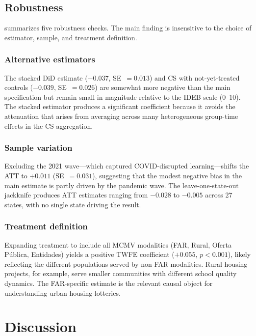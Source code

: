 \documentclass[12pt]{article}
\begin{document}
\subsection{Robustness}



 summarizes five robustness checks. The main finding is insensitive to the choice of estimator, sample, and treatment definition.

\subsubsection*{Alternative estimators} The stacked DiD estimate ($-0.037$, SE~$= 0.013$) and CS with not-yet-treated controls ($-0.039$, SE~$= 0.026$) are somewhat more negative than the main specification but remain small in magnitude relative to the IDEB scale (0--10). The stacked estimator produces a significant coefficient because it avoids the attenuation that arises from averaging across many heterogeneous group-time effects in the CS aggregation.

\subsubsection*{Sample variation} Excluding the 2021 wave---which captured COVID-disrupted learning---shifts the ATT to $+0.011$ (SE~$= 0.031$), suggesting that the modest negative bias in the main estimate is partly driven by the pandemic wave. The leave-one-state-out jackknife produces ATT estimates ranging from $-0.028$ to $-0.005$ across 27 states, with no single state driving the result.

\subsubsection*{Treatment definition} Expanding treatment to include all MCMV modalities (FAR, Rural, Oferta P\'ublica, Entidades) yields a positive TWFE coefficient ($+0.055$, $p < 0.001$), likely reflecting the different populations served by non-FAR modalities. Rural housing projects, for example, serve smaller communities with different school quality dynamics. The FAR-specific estimate is the relevant causal object for understanding urban housing lotteries.


\section{Discussion}
\end{document}
